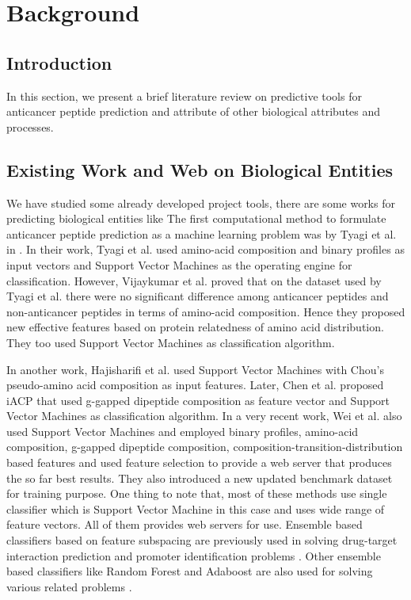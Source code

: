 \chapter{Background} \label{Related Work}
\ifpdf
    \graphicspath{{chapter_2/figures/PNG/}{chapter_2/figures/PDF/}{chapter_2/figures/}}
\else
    \graphicspath{{chapter_2/figures/EPS/}{chapter_2/figures/}}
\fi

\section{Introduction}
In this section, we present a brief literature review on predictive tools for anticancer peptide prediction and attribute of other biological attributes and processes.
\section{Existing Work and Web on Biological Entities}
We have studied some already developed project tools, there are some works for predicting biological entities like The first computational method to formulate anticancer peptide prediction as a machine learning problem was by Tyagi et al. in \cite{tyagi2013silico}. In their work, Tyagi et al. used amino-acid composition and binary profiles as input vectors and Support Vector Machines as the operating engine for classification. However, Vijaykumar et al. \cite{vijayakumar2015acpp} proved that on the dataset used by Tyagi et al. there were no significant difference among anticancer peptides and non-anticancer peptides in terms of amino-acid composition. Hence they proposed new effective features based on protein relatedness of amino acid distribution. They too used Support Vector Machines as classification algorithm.

In another work, Hajisharifi et al. \cite{hajisharifi2014predicting} used Support Vector Machines with Chou's pseudo-amino acid composition as input features. Later, Chen et al. proposed iACP \cite{chen2016iacp} that used g-gapped dipeptide composition as feature vector and Support Vector Machines as classification algorithm. In a very recent work, Wei et al. \cite{wei2018acpred} also used Support Vector Machines and employed binary profiles, amino-acid composition, g-gapped dipeptide composition, composition-transition-distribution based features and used feature selection to provide a web server that produces the so far best results. They also introduced a new updated benchmark dataset for training purpose. One thing to note that, most of these methods use single classifier which is Support Vector Machine in this case and uses wide range of feature vectors. All of them provides web servers for use. Ensemble based classifiers based on feature subspacing are previously used in solving drug-target interaction prediction \cite{rayhan2018cfsboost} and promoter identification problems \cite{rahman2018ipromoter}. Other ensemble based classifiers like Random Forest and Adaboost are also used for solving various related problems \cite{jani2018irecspot,rahman2018dpp}.
 
